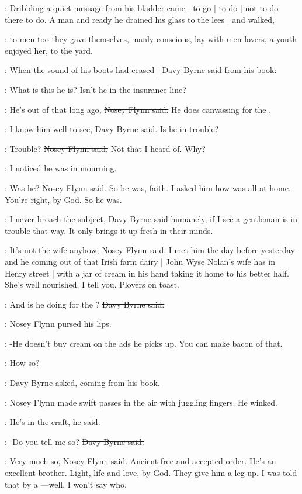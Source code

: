 :
Dribbling a quiet message from his bladder came |
to go |
to do |
not to do there to do.
A man and ready he drained his glass to the lees |
and walked,

:
to men too they gave themselves,
manly conscious,
lay with men lovers,
a youth enjoyed her,
to the yard.

:
When the sound of his boots had ceased |
Davy Byrne said from his book:

\davybyrne:
What is this he is?
Isn't he in the insurance line?

\nosey:
He's out of that long ago,
\sout{Nosey Flynn said.}
He does canvassing for the .

\davybyrne:
I know him well to see,
\sout{Davy Byrne said.}
Is he in trouble?

\nosey:
Trouble?
\sout{Nosey Flynn said.}
Not that I heard of.
Why?

\davybyrne:
I noticed he was in mourning.

\nosey:
Was he?
\sout{Nosey Flynn said.}
So he was, faith.
I asked him how was all at home.
You're right, by God.
So he was.

\davybyrne:
I never broach the subject,
\sout{Davy Byrne said humanely,}
if I see a gentleman is in trouble that way.
It only brings it up fresh in their minds.

\nosey:
It's not the wife anyhow,
\sout{Nosey Flynn said.}
I met him the day before yesterday
and he coming out of that Irish farm dairy |
John Wyse Nolan's wife has in Henry street |
with a jar of cream in his hand taking it home to his better half.
She's well nourished, I tell you.
Plovers on toast.

\davybyrne:
And is he doing for the ?
\sout{Davy Byrne said.}

:
Nosey Flynn pursed his lips.

\nosey:
-He doesn't buy cream on the ads he picks up.
You can make bacon of that.

\davybyrne:
How so?

:
Davy Byrne asked,
coming from his book.

:
Nosey Flynn made swift passes in the air with juggling fingers.
He winked.

\nosey:
He's in the craft,
\sout{he said.}

\davybyrne:
-Do you tell me so?
\sout{Davy Byrne said.}

\nosey:
Very much so,
\sout{Nosey Flynn said.}
Ancient free and accepted order.
He's an excellent brother.
Light, life and love, by God.
They give him a leg up.
I was told that by a%
---well, I won't say who.

